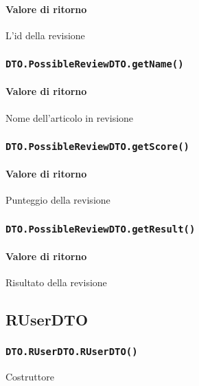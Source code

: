\paragraph{Valore di ritorno}
\begin{description}
\item L'id della revisione
\end{description}
\subsubsection{\texttt{DTO.PossibleReviewDTO.getName()}}
\paragraph{Valore di ritorno}
\begin{description}
\item Nome dell'articolo in revisione
\end{description}
\subsubsection{\texttt{DTO.PossibleReviewDTO.getScore()}}
\paragraph{Valore di ritorno}
\begin{description}
\item Punteggio della revisione
\end{description}
\subsubsection{\texttt{DTO.PossibleReviewDTO.getResult()}}
\paragraph{Valore di ritorno}
\begin{description}
\item Risultato della revisione
\end{description}

\subsection{RUserDTO}
\subsubsection{\texttt{DTO.RUserDTO.RUserDTO()}}
Costruttore

